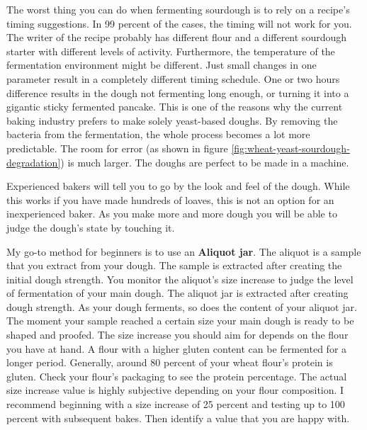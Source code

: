 The worst thing you can do when fermenting sourdough 
is to rely on a recipe's timing suggestions. In 99 percent
of the cases, the timing will not work for you. The writer
of the recipe probably has different flour and a different
sourdough starter with different levels of activity. Furthermore,
the temperature of the fermentation environment might be
different. Just small changes in one parameter result
in a completely different timing schedule. One or two hours
difference results in the dough not fermenting long enough, or
turning it into a gigantic sticky fermented pancake. This
is one of the reasons why the current baking industry prefers
to make solely yeast-based doughs. By removing the bacteria
from the fermentation, the whole process becomes a lot more
predictable. The room for error (as shown in figure \ref{fig:wheat-yeast-sourdough-degradation})
is much larger. The doughs are perfect to be made in a
machine.

Experienced bakers will tell you to go by the look and feel of
the dough. While this works if you have made hundreds of loaves,
this is not an option for an inexperienced baker. As
you make more and more dough you will be able to judge
the dough's state by touching it. 

My go-to method for beginners is to use an \textbf{Aliquot jar}.
The aliquot is a sample that you extract from your dough. The
sample is extracted after creating the initial dough strength.
You monitor the aliquot's size increase to judge the
level of fermentation of your main dough. The aliquot
jar is extracted after creating dough strength. As your
dough ferments, so does the content of your aliquot jar. The moment your
sample reached a certain size your main dough is ready
to be shaped and proofed. The size increase you should
aim for depends on the flour you have at hand. A flour
with a higher gluten content can be fermented for a
longer period. Generally, around 80 percent
of your wheat flour's protein is gluten. Check your flour's
packaging to see the protein percentage. The actual size increase
value is highly subjective depending on your flour composition.
I recommend beginning with a size increase of 25 percent and testing
up to 100 percent with subsequent bakes. Then identify a value
that you are happy with.

